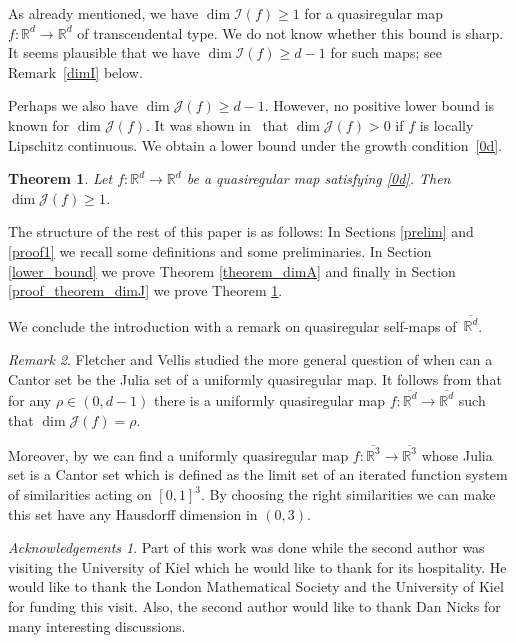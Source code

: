 \documentclass[12pt,a4paper]{amsart}
\theoremstyle{plain}
\newtheorem{theorem}{Theorem}[section]
\theoremstyle{definition}
\theoremstyle{remark}
\newtheorem{remark}[theorem]{Remark}
\newtheorem*{remark3}{Acknowledgements}
\def\R{\mathbb R}
\def\cI{\mathcal I}
\def\cJ{\mathcal J}
\numberwithin{equation}{section}
\begin{document}
As already mentioned, we have $\dim \cI(f)\geq 1$ for a quasiregular map
$f\colon \R^d\to\R^d$ of transcendental type.
We do not know whether this bound is sharp. It seems plausible that we have 
$\dim \cI(f)\geq d-1$ for such maps; see Remark~\ref{dimI} below.

Perhaps we also have $\dim \cJ(f)\geq d-1$.
However, no positive lower bound is known for $\dim \cJ(f)$.
It was shown in~\cite[Theorem~1.7]{BN} that $\dim \cJ(f)>0$ if $f$ is locally Lipschitz continuous. 
We obtain a lower bound under the growth condition~\eqref{0d}.

\begin{theorem}\label{theorem_dimJ}
Let $f\colon\mathbb{R}^d\to\mathbb{R}^d$ be a quasiregular map satisfying \eqref{0d}. 
Then $\dim \mathcal{J}(f)\geq 1$.
\end{theorem}
The structure of the rest of this paper is as follows: In Sections \ref{prelim} and \ref{proof1} we recall some definitions and some preliminaries. In Section  \ref{lower_bound} we prove Theorem \ref{theorem_dimA} and finally in Section \ref{proof_theorem_dimJ} we prove Theorem \ref{theorem_dimJ}.

We conclude the introduction with a remark on quasiregular self-maps of~$\overline{\R^d}$.
\begin{remark}
Fletcher and Vellis \cite{Fletcher2021} studied the more general question of when can a Cantor set be the
Julia set of a uniformly quasiregular map. It follows
from \cite[Theorem 1.2]{Fletcher2021} that for any $\rho\in(0,d-1)$ there is a uniformly quasiregular
map $f\colon\overline{\R^d}\to\overline{\R^d}$ such that $\dim \mathcal{J}(f)=\rho$. 
	 
Moreover, by \cite[Corollary 1.4]{Fletcher2021} we can find a uniformly quasiregular map
$f\colon\overline{\R^3}\to\overline{\R^3}$ whose Julia set is a Cantor set which is
defined as the limit set of an iterated function system of similarities acting on $[0,1]^3$.
By choosing the right similarities we can make this set have any Hausdorff dimension in $(0,3)$.
	

 
\end{remark}

\begin{remark3}
Part of this work was done while the second author was visiting the University of Kiel which he would like to thank for its hospitality. He would like to thank the London Mathematical Society and the University of Kiel for funding this visit. Also, the second author would like to thank Dan Nicks for many interesting discussions. 
\end{remark3}
\end{document}

